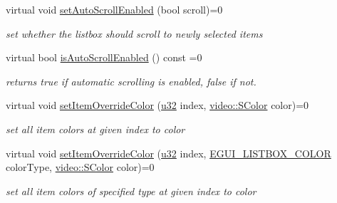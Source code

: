\begin{DoxyCompactItemize}
\mbox{\label{classirr_1_1gui_1_1IGUIListBox_a4d8ada56cafff847e98564283b2d06ac}} 
virtual void \hyperlink{classirr_1_1gui_1_1IGUIListBox_a4d8ada56cafff847e98564283b2d06ac}{set\+Auto\+Scroll\+Enabled} (bool scroll)=0
\begin{DoxyCompactList}\small\item\em set whether the listbox should scroll to newly selected items \end{DoxyCompactList}\item 
\mbox{\label{classirr_1_1gui_1_1IGUIListBox_af04876e1e3173e9c13bb099076743137}} 
virtual bool \hyperlink{classirr_1_1gui_1_1IGUIListBox_af04876e1e3173e9c13bb099076743137}{is\+Auto\+Scroll\+Enabled} () const =0
\begin{DoxyCompactList}\small\item\em returns true if automatic scrolling is enabled, false if not. \end{DoxyCompactList}\item 
\mbox{\label{classirr_1_1gui_1_1IGUIListBox_ae2f09b02e7428175e13fa6b3216ced67}} 
virtual void \hyperlink{classirr_1_1gui_1_1IGUIListBox_ae2f09b02e7428175e13fa6b3216ced67}{set\+Item\+Override\+Color} (\hyperlink{namespaceirr_a0416a53257075833e7002efd0a18e804}{u32} index, \hyperlink{classirr_1_1video_1_1SColor}{video\+::\+S\+Color} color)=0
\begin{DoxyCompactList}\small\item\em set all item colors at given index to color \end{DoxyCompactList}\item 
\mbox{\label{classirr_1_1gui_1_1IGUIListBox_a84444d888931d79dcc50a8f229aad2c7}} 
virtual void \hyperlink{classirr_1_1gui_1_1IGUIListBox_a84444d888931d79dcc50a8f229aad2c7}{set\+Item\+Override\+Color} (\hyperlink{namespaceirr_a0416a53257075833e7002efd0a18e804}{u32} index, \hyperlink{namespaceirr_1_1gui_a7da705f0a0b4aa5385e6842adf409cb6}{E\+G\+U\+I\+\_\+\+L\+I\+S\+T\+B\+O\+X\+\_\+\+C\+O\+L\+OR} color\+Type, \hyperlink{classirr_1_1video_1_1SColor}{video\+::\+S\+Color} color)=0
\begin{DoxyCompactList}\small\item\em set all item colors of specified type at given index to color \end{DoxyCompactList}\item 

\end{DoxyCompactItemize}
